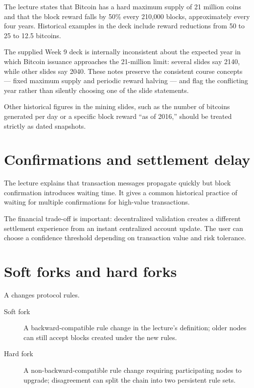 The lecture states that Bitcoin has a hard maximum supply of 21 million coins and that the block reward falls by 50\% every 210,000 blocks, approximately every four years. Historical examples in the deck include reward reductions from 50 to 25 to 12.5 bitcoins.

\begin{libnote}
The supplied Week 9 deck is internally inconsistent about the expected year in which Bitcoin issuance approaches the 21-million limit: several slides say 2140, while other slides say 2040. These notes preserve the consistent course concepts --- fixed maximum supply and periodic reward halving --- and flag the conflicting year rather than silently choosing one of the slide statements.
\end{libnote}

Other historical figures in the mining slides, such as the number of bitcoins generated per day or a specific block reward ``as of 2016,'' should be treated strictly as dated snapshots.

\section{Confirmations and settlement delay}

The lecture explains that transaction messages propagate quickly but block confirmation introduces waiting time. It gives a common historical practice of waiting for multiple confirmations for high-value transactions.

The financial trade-off is important: decentralized validation creates a different settlement experience from an instant centralized account update. The user can choose a confidence threshold depending on transaction value and risk tolerance.

\section{Soft forks and hard forks}

A  changes protocol rules.

\begin{description}
  \item[Soft fork] A backward-compatible rule change in the lecture's definition; older nodes can still accept blocks created under the new rules.
  \item[Hard fork] A non-backward-compatible rule change requiring participating nodes to upgrade; disagreement can split the chain into two persistent rule sets.
\end{description}


